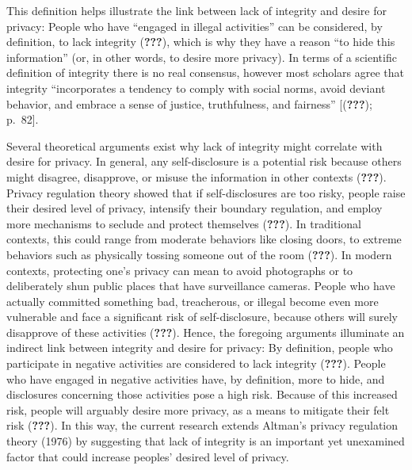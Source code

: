 \documentclass[man]{apa6}
\theoremstyle{definition}
\theoremstyle{definition}
\theoremstyle{definition}
\theoremstyle{remark}
\begin{document}
This definition helps illustrate the link between lack of integrity and
desire for privacy: People who have \enquote{engaged in illegal
activities} can be considered, by definition, to lack integrity
({\textbf{???}}), which is why they have a reason \enquote{to hide this
information} (or, in other words, to desire more privacy). In terms of a
scientific definition of integrity there is no real consensus, however
most scholars agree that integrity \enquote{incorporates a tendency to
comply with social norms, avoid deviant behavior, and embrace a sense of
justice, truthfulness, and fairness} {[}({\textbf{???}}); p.~82{]}.

Several theoretical arguments exist why lack of integrity might
correlate with desire for privacy. In general, any self-disclosure is a
potential risk because others might disagree, disapprove, or misuse the
information in other contexts ({\textbf{???}}). Privacy regulation
theory showed that if self-disclosures are too risky, people raise their
desired level of privacy, intensify their boundary regulation, and
employ more mechanisms to seclude and protect themselves
({\textbf{???}}). In traditional contexts, this could range from
moderate behaviors like closing doors, to extreme behaviors such as
physically tossing someone out of the room ({\textbf{???}}). In modern
contexts, protecting one's privacy can mean to avoid photographs or to
deliberately shun public places that have surveillance cameras. People
who have actually committed something bad, treacherous, or illegal
become even more vulnerable and face a significant risk of
self-disclosure, because others will surely disapprove of these
activities ({\textbf{???}}). Hence, the foregoing arguments illuminate
an indirect link between integrity and desire for privacy: By
definition, people who participate in negative activities are considered
to lack integrity ({\textbf{???}}). People who have engaged in negative
activities have, by definition, more to hide, and disclosures concerning
those activities pose a high risk. Because of this increased risk,
people will arguably desire more privacy, as a means to mitigate their
felt risk ({\textbf{???}}). In this way, the current research extends
Altman's privacy regulation theory (1976) by suggesting that lack of
integrity is an important yet unexamined factor that could increase
peoples' desired level of privacy.
\end{document}
